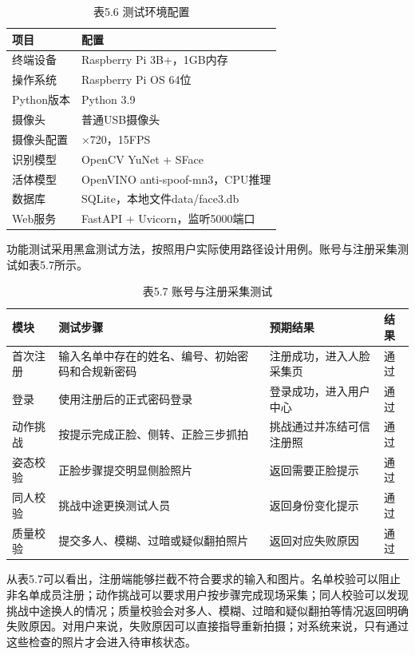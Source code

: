 \documentclass[UTF8]{heuthesis}
\begin{document}
\begingroup
\small
\begin{longtable}{|>{\raggedright\arraybackslash}p{}|>{\raggedright\arraybackslash}p{}|}
\caption{表5.6 测试环境配置}\\
\hline
项目 & 配置 \\
\hline
终端设备 & Raspberry Pi 3B+，1GB内存 \\
\hline
操作系统 & Raspberry Pi OS 64位 \\
\hline
Python版本 & Python 3.9 \\
\hline
摄像头 & 普通USB摄像头 \\
\hline
摄像头配置 & 1280×720，15FPS \\
\hline
识别模型 & OpenCV YuNet + SFace \\
\hline
活体模型 & OpenVINO anti-spoof-mn3，CPU推理 \\
\hline
数据库 & SQLite，本地文件data/face3.db \\
\hline
Web服务 & FastAPI + Uvicorn，监听5000端口 \\
\hline
\end{longtable}
\endgroup

功能测试采用黑盒测试方法，按照用户实际使用路径设计用例。账号与注册采集测试如表5.7所示。

\begingroup
\small
\begin{longtable}{|>{\raggedright\arraybackslash}p{}|>{\raggedright\arraybackslash}p{}|>{\raggedright\arraybackslash}p{}|>{\raggedright\arraybackslash}p{}|}
\caption{表5.7 账号与注册采集测试}\\
\hline
模块 & 测试步骤 & 预期结果 & 结果 \\
\hline
首次注册 & 输入名单中存在的姓名、编号、初始密码和合规新密码 & 注册成功，进入人脸采集页 & 通过 \\
\hline
登录 & 使用注册后的正式密码登录 & 登录成功，进入用户中心 & 通过 \\
\hline
动作挑战 & 按提示完成正脸、侧转、正脸三步抓拍 & 挑战通过并冻结可信注册照 & 通过 \\
\hline
姿态校验 & 正脸步骤提交明显侧脸照片 & 返回需要正脸提示 & 通过 \\
\hline
同人校验 & 挑战中途更换测试人员 & 返回身份变化提示 & 通过 \\
\hline
质量校验 & 提交多人、模糊、过暗或疑似翻拍照片 & 返回对应失败原因 & 通过 \\
\hline
\end{longtable}
\endgroup

从表5.7可以看出，注册端能够拦截不符合要求的输入和图片。名单校验可以阻止非名单成员注册；动作挑战可以要求用户按步骤完成现场采集；同人校验可以发现挑战中途换人的情况；质量校验会对多人、模糊、过暗和疑似翻拍等情况返回明确失败原因。对用户来说，失败原因可以直接指导重新拍摄；对系统来说，只有通过这些检查的照片才会进入待审核状态。
\end{document}
